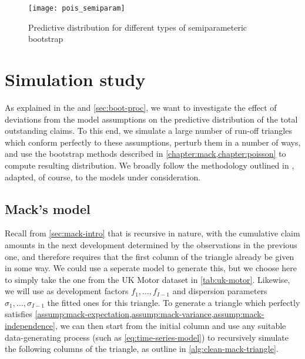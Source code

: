 \documentclass[a4paper]{book}
\begin{document}
\begin{figure}[!htb]
  \texttt{[image: pois\_semiparam]}
  \caption{Predictive distribution for different types of semiparameteric bootstrap}
  \label{fig:pred-semiparam}
\end{figure}


\chapter{Simulation study}


As explained in the  and \cref{sec:boot-proc}, we want to investigate the effect of deviations from the model assumptions on the predictive distribution of the total outstanding claims. To this end, we simulate a large number of run-off triangles which conform perfectly to these assumptions, perturb them in a number of ways, and use the bootstrap methods described in \cref{chapter:mack,chapter:poisson} to compute resulting distribution. We broadly follow the methodology outlined in \cite{schiegl}, adapted, of course, to the models under consideration.

\section{Mack's model}

Recall from \cref{sec:mack-intro} that  is recursive in nature, with the cumulative claim amounts in the next development determined by the observations in the previous one, and therefore requires that the first column of the triangle already be given in some way. We could use a seperate model to generate this, but we choose here to simply take the one from the UK Motor dataset in \cref{tab:uk-motor}. Likewise, we will use as development factors $f_1, \dots, f_{I - 1}$ and dispersion parameters $\sigma_1, \dots, \sigma_{I - 1}$ the fitted ones for this triangle. To generate a triangle which perfectly satisfies \cref{assump:mack-expectation,assump:mack-variance,assump:mack-independence}, we can then start from the initial column and use any suitable data-generating process (such as \cref{eq:time-series-model}) to recursively simulate the following columns of the triangle, as outline in \cref{alg:clean-mack-triangle}.
\end{document}
